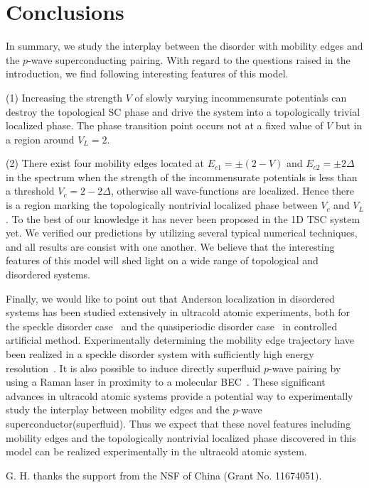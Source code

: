 \documentclass[prb,showpacs,twocolumn,aps,superscriptaddress,a4paper]{revtex4-1}
\begin{document}

\section{Conclusions}
\label{n4}
In summary, we study the interplay between the disorder with mobility edges and the $p$-wave superconducting pairing. With regard to the questions raised in the introduction, we find following interesting features of this model.

(1)  Increasing the strength $V$ of slowly varying incommensurate potentials can destroy the topological SC phase and drive
the system into a topologically trivial localized phase. The phase transition point occurs not at a fixed value of $V$ but in a region around $V_L=2$.

(2) There exist four mobility edges located at $E_{c1}=\pm (2- V)$ and $E_{c2}=\pm 2\Delta$ in the spectrum when the strength of the incommensurate potentials is less than a threshold $V_c = 2 - 2 \Delta$, otherwise all wave-functions are localized. Hence there is a region marking the topologically nontrivial localized phase between $V_c$ and $V_L$. To the best of our knowledge it has never been proposed in the 1D TSC system yet. We verified our predictions by utilizing several typical numerical techniques, and all results are consist with one another. We believe that the interesting features of this model will shed light on a wide range of topological and disordered systems.

Finally, we would like to point out that Anderson localization in disordered systems has been studied extensively in ultracold atomic experiments, both for the speckle disorder case~\cite{B24} and the quasiperiodic disorder case~\cite{R25} in controlled artificial method. Experimentally determining the mobility edge trajectory have been realized in a speckle disorder system with sufficiently high energy resolution~\cite{D26,J27,S28}. It is also possible to induce directly superfluid $p$-wave pairing by using a Raman laser in proximity to a molecular BEC~\cite{Jiang,Nascimbene}. These significant advances in ultracold atomic systems provide a potential way to experimentally study the interplay between mobility edges and the $p$-wave superconductor(superfluid). Thus we expect that these novel features including mobility edges and the topologically nontrivial localized phase discovered in this model can be
realized experimentally in the ultracold atomic system.
\begin{acknowledgments}
G. H. thanks the support from the NSF of China (Grant No.
11674051).
\end{acknowledgments}
\end{document}
